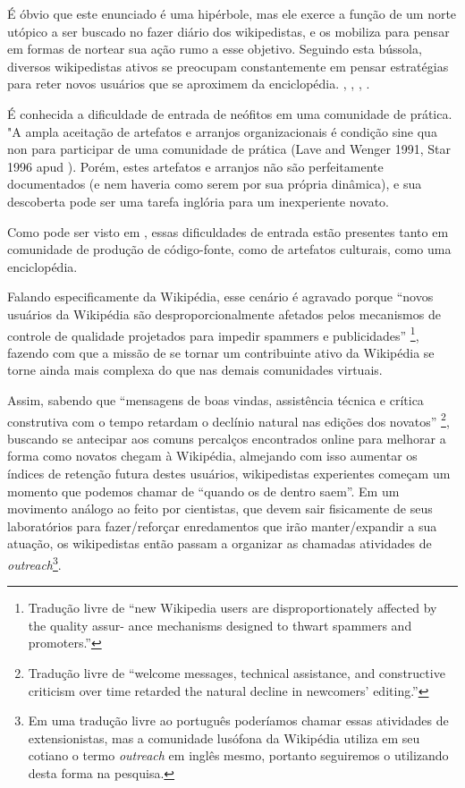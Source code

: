 É óbvio que este enunciado é uma hipérbole, mas ele exerce a função de um norte utópico a ser buscado no fazer diário dos wikipedistas, e os mobiliza para pensar em formas de nortear sua ação rumo a esse objetivo. Seguindo esta bússola, diversos wikipedistas ativos se preocupam constantemente em pensar estratégias para reter novos usuários que se aproximem da enciclopédia. \citep{faulkner_etiquette_2012}, \citep{suh_singularity_2009}, \citep{musicant_mentoring_2011}, \citep{narayan_wikipedia_2017}.

É conhecida a dificuldade de entrada de neófitos em uma comunidade de prática. "A ampla aceitação de artefatos e arranjos organizacionais é condição sine qua non para participar de uma comunidade de prática (Lave and Wenger 1991, Star 1996 apud \cite{feitosa_cidadao_2010}). Porém, estes artefatos e arranjos não são perfeitamente documentados (e nem haveria como serem por sua própria dinâmica), e sua descoberta pode ser uma tarefa inglória para um inexperiente novato.

Como pode ser visto em \citep{steinmacher_social_2015}, essas dificuldades de entrada estão presentes tanto em comunidade de produção de código-fonte, como de artefatos culturais, como uma enciclopédia.

Falando especificamente da Wikipédia, esse cenário é agravado porque ``novos usuários da Wikipédia são desproporcionalmente afetados pelos mecanismos de controle de qualidade projetados para impedir spammers e publicidades'' \citep{schneider_accept_2014} \footnote{Tradução livre de ``new Wikipedia users are disproportionately affected by the quality assur- ance mechanisms designed to thwart spammers and promoters.''}, fazendo com que a missão de se tornar um contribuinte ativo da Wikipédia se torne ainda mais complexa do que nas demais comunidades virtuais.

Assim, sabendo que ``mensagens de boas vindas, assistência técnica e crítica construtiva com o tempo retardam o declínio natural nas edições dos novatos'' \citep{choi_socialization_2010}\footnote{Tradução livre de ``welcome messages, technical assistance, and constructive criticism over time retarded the natural decline in newcomers’ editing.''}, buscando se antecipar aos comuns percalços encontrados online para melhorar a forma como novatos chegam à Wikipédia, almejando com isso aumentar os índices de retenção futura destes usuários, wikipedistas experientes começam um momento que podemos chamar de  ``quando os de dentro saem''. Em um movimento análogo ao feito por cientistas, que devem sair fisicamente de seus laboratórios para fazer/reforçar enredamentos que irão manter/expandir a sua atuação, os wikipedistas então passam a organizar as chamadas atividades de \textit{outreach}\footnote{Em uma tradução livre ao português poderíamos chamar essas atividades de extensionistas, mas a comunidade lusófona da Wikipédia utiliza em seu cotiano o termo \textit{outreach} em inglês mesmo, portanto seguiremos o utilizando desta forma na pesquisa.}. 

